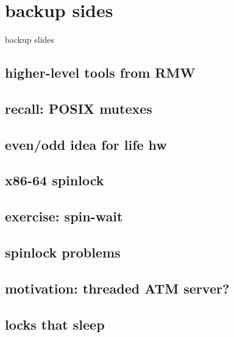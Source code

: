 

\section{backup sides}
\begin{frame}{}
\end{frame}

\begin{frame}{backup slides}
\end{frame}

\subsection{higher-level tools from RMW}


\subsection{recall: POSIX mutexes}


\subsection{even/odd idea for life hw}


\subsection{x86-64 spinlock}


\subsection{exercise: spin-wait}


\subsection{spinlock problems}


\subsection{motivation: threaded ATM server?}


\subsection{locks that sleep}

